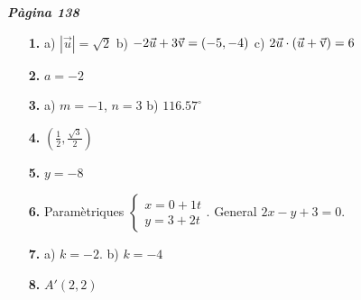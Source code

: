 \documentclass[a4paper, pdf, twoside]{book}
\begin{document}
\begin{multicols}{2}
 

\vspace*{0.4cm}
 {}
\vspace{0.3cm}


{\textbf{\em Pàgina 138}} \hrulefill
\begin{enumerate}
\vspace{0.25cm}
\item[\fontfamily{phv}\selectfont\color{blue}\textbf{1. }]  \scalebox{0.6}{\simbolclau } 
a) $|\vec u|=\sqrt {2}$ b) $-2\vec u + 3\vec{\mathrm{v}} =(-5,-4)$ c) $2\vec u \cdot (\vec u + \vec{\mathrm{v}} )=6$
 \end{enumerate}
\begin{enumerate}
\vspace{0.25cm}
\item[\fontfamily{phv}\selectfont\color{blue}\textbf{2. }]  \scalebox{0.6}{\simbolclau } 
 $a=-2$
\vspace{0.25cm}
\item[\fontfamily{phv}\selectfont\color{blue}\textbf{3. }]  \scalebox{0.6}{\simbolclau } 
a) $m=-1$, $n=3$ b) $116.57^\circ $
\vspace{0.25cm}
\item[\fontfamily{phv}\selectfont\color{blue}\textbf{4. }]  \scalebox{0.6}{\simbolclau } 
$(\frac {1}{2}, \frac {\sqrt {3}}{2})$
\vspace{0.25cm}
\item[\fontfamily{phv}\selectfont\color{blue}\textbf{5. }]  \scalebox{0.6}{\simbolclau } 
$y=-8$
\vspace{0.25cm}
\item[\fontfamily{phv}\selectfont\color{blue}\textbf{6. }]  \scalebox{0.6}{\simbolclau } 
Paramètriques $\left \{\begin {array}{l} x=0+1t \\ y=3+2t \end {array}\right .$. General $2x-y+3=0$.
\vspace{0.25cm}
\item[\fontfamily{phv}\selectfont\color{blue}\textbf{7. }]  \scalebox{0.6}{\simbolclau } 
a) $k=-2$. b) $k=-4$
\vspace{0.25cm}
\item[\fontfamily{phv}\selectfont\color{blue}\textbf{8. }]  \scalebox{0.6}{\simbolclau } 
$A'(2,2)$
 \end{enumerate}
\vspace{0.3cm}


\end{multicols}
\end{document}
